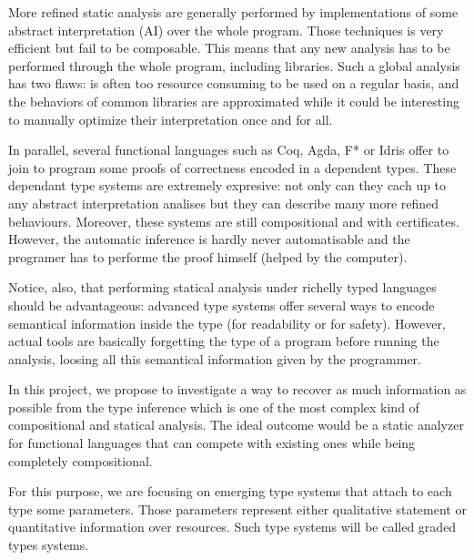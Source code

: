 \documentclass{article}[11pt]
\begin{document}
More refined static analysis are generally performed by implementations of some abstract interpretation (AI) over the whole program. Those techniques is very efficient but fail to be composable. This means that any new analysis has to be performed through the whole program, including libraries. Such a global analysis has two flaws: is often too resource consuming to be used on a regular basis, and the behaviors of common libraries are approximated while it could be interesting to manually optimize their interpretation once and for all.

In parallel, several functional languages such as Coq, Agda, F* or Idris offer to join to program some proofs of correctness encoded in a dependent types. These dependant type systems are extremely expresive: not only can they cach up to any abstract interpretation analises but they can describe many more refined behaviours. Moreover, these systems are still compositional and with certificates. However, the automatic inference is hardly never automatisable and the programer has to performe the proof himself (helped by the computer).

Notice, also, that performing statical analysis under richelly typed languages should be advantageous:  advanced type systems offer several ways to encode semantical information inside the type (for readability or for safety). However, actual tools are basically forgetting the type of a program before running the analysis, loosing all this semantical information given by the programmer.

In this project, we propose to investigate a way to recover as much information as possible from the type inference which is one of the most complex kind of compositional and statical analysis. The ideal outcome would be a static analyzer for functional languages that can compete with existing ones while being completely compositional.

For this purpose, we are focusing on emerging type systems that attach to each type some parameters. Those parameters represent either qualitative statement or quantitative information over resources. Such type systems will be called graded types systems.
\end{document}
